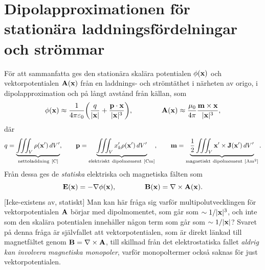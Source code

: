 {{{{{\section{Dipolapproximationen f{\"o}r station{\"a}ra laddningsf{\"o}rdelningar
   och str{\"o}mmar}
F{\"o}r att sammanfatta ges den station{\"a}ra skal{\"a}ra potentialen
$\phi({\bf x})$ och vektorpotentialen ${\bf A}({\bf x})$ fr{\aa}n en
laddnings- och str{\"o}mt{\"a}thet i n{\"a}rheten av origo, i dipolapproximation
och p{\aa} l{\aa}ngt avst{\aa}nd fr{\aa}n k{\"a}llan, som
$$
  \phi({\bf x})\approx{{1}\over{4\pi\varepsilon_0}}\bigg(
      {{q}\over{|{\bf x}|}} + {{{\bf p}\cdot{\bf x}}\over{|{\bf x}|^3}}
    \bigg),\qquad\qquad
  {\bf A}({\bf x})\approx{{\mu_0}\over{4\pi}}
      {{{\bf m}\times{\bf x}}\over{|{\bf x}|^3}},
$$
d{\"a}r
$$
  q=\underbrace{
      \iiint_{V} \rho({\bf x}')\,dV'
    }_{{\rm nettoladdning}\ [{\rm C}]},\qquad
  {\bf p}=\underbrace{
      \iiint_{V} x'_k \rho({\bf x}')\,dV'
    }_{{\rm elektriskt\ dipolmoment}\ [{\rm C}{\rm m}]},\qquad
  {\bf m}=\underbrace{
      {{1}\over{2}}\iiint_{V} {\bf x}'\times{\bf J}({\bf x}')\,dV'
    }_{{\rm magnetiskt\ dipolmoment}\ [{\rm A}{\rm m}^2]}.
$$
Fr{\aa}n dessa ges de {\it statiska} elektriska och magnetiska f{\"a}lten
som
$$
  {\bf E}({\bf x})=-\nabla\phi({\bf x}),\qquad\qquad
  {\bf B}({\bf x})=\nabla\times{\bf A}({\bf x}).
$$
[Icke-existens av, statiskt]
Man kan h{\"a}r fr{\aa}ga sig varf{\"o}r multipolutvecklingen f{\"o}r
vektorpotentialen ${\bf A}$ b{\"o}rjar med dipolmomentet, som g{\aa}r som
$\sim 1/|{\bf x}|^3$, och inte som den skal{\"a}ra potentialen inneh{\aa}ller
n{\aa}gon term som g{\aa}r som $\sim 1/|{\bf x}|$? Svaret p{\aa} denna
fr{\aa}ga {\"a}r sj{\"a}lvfallet att vektorpotentialen, som {\"a}r direkt
l{\"a}nkad till magnetf{\"a}ltet genom ${\bf B}=\nabla\times{\bf A}$, till
skillnad fr{\aa}n det elektrostatiska fallet {\it aldrig kan involvera
magnetiska monopoler}, varf{\"o}r monopoltermer ocks{\aa} saknas f{\"o}r
just vektorpotentialen.
\vfill\eject

}}}}}
